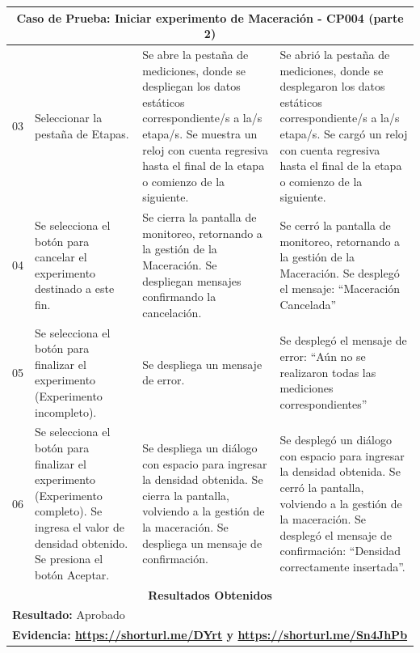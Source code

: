         \begin{minipage}{0.95\textwidth}
        \begin{center}
        \begin{tabularx}{\textwidth}{ | p{2cm} | X | X | X |}
        \hline
        \multicolumn{4}{|c|}{\textbf{Caso de Prueba: Iniciar experimento de Maceración - CP004 (parte 2)}} \\
        \hline
        03 & Seleccionar la pestaña de Etapas. & Se abre la pestaña de mediciones, donde se despliegan los datos estáticos correspondiente/s a la/s etapa/s. Se muestra un reloj con cuenta regresiva hasta el final de la etapa o comienzo de la siguiente. & Se abrió la pestaña de mediciones, donde se desplegaron los datos estáticos correspondiente/s a la/s etapa/s. Se cargó un reloj con cuenta regresiva hasta el final de la etapa o comienzo de la siguiente. \\
        \hline
        04 & Se selecciona el botón para cancelar el experimento destinado a este fin. & Se cierra la pantalla de monitoreo, retornando a la gestión de la Maceración. Se despliegan mensajes confirmando la cancelación. & Se cerró la pantalla de monitoreo, retornando a la gestión de la Maceración. Se desplegó el mensaje: ``Maceración Cancelada'' \\
        \hline
        05 & Se selecciona el botón para finalizar el experimento (Experimento incompleto). & Se despliega un mensaje de error. & Se desplegó el mensaje de error: ``Aún no se realizaron todas las mediciones correspondientes'' \\
        \hline
        06 & Se selecciona el botón para finalizar el experimento (Experimento completo). Se ingresa el valor de densidad obtenido. Se presiona el botón Aceptar. & Se despliega un diálogo con espacio para ingresar la densidad obtenida. Se cierra la pantalla, volviendo a la gestión de la maceración. Se despliega un mensaje de confirmación. & Se desplegó un diálogo con espacio para ingresar la densidad obtenida. Se cerró la pantalla, volviendo a la gestión de la maceración. Se desplegó el mensaje de confirmación: ``Densidad correctamente insertada''. \\
        \hline
        
        \multicolumn{4}{|c|}{\textbf{Resultados Obtenidos}} \\
        \hline
        \multicolumn{4}{|l|}{\textbf{Resultado:} Aprobado} \\
        \hline
        \multicolumn{4}{|l|}{\textbf{Evidencia: \url{https://shorturl.me/DYrt} y \url{https://shorturl.me/Sn4JhPb} }} \\
        \hline
     \end{tabularx}
    \label{CP004-p2}
    \end{center}
    \end{minipage}
    
